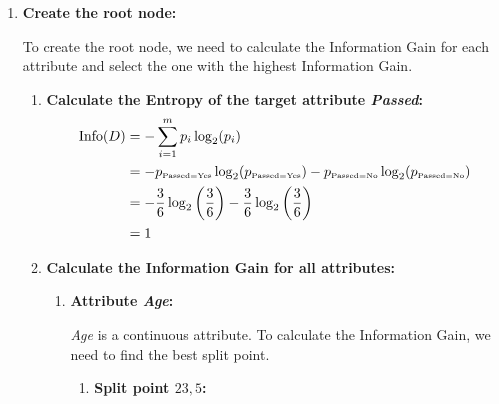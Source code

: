 \documentclass[
english,
smallborders
]{i6prcsht}
\newcommand{\OfSpecificValue}[3]{_{\text{\tiny #1#2#3}}}
\begin{document}
\begin{solution}
	\begin{enumerate}
		\item \textbf{Create the root node:}
		      
		      To create the root node, we need to calculate the Information Gain for each attribute and select the one with the highest Information Gain.
		      
		      \begin{enumerate}
			      \item \textbf{Calculate the Entropy of the target attribute \textit{Passed}:}
			            \begin{alignat*}{2}
				            \text{Info}(D) & = -\sum_{i=1}^{m}p_i \log_2(p_i)                                                                                                                          \\
				                           & = -p\OfSpecificValue{Passed}{=}{Yes} \log_2(p\OfSpecificValue{Passed}{=}{Yes})- p\OfSpecificValue{Passed}{=}{No} \log_2(p\OfSpecificValue{Passed}{=}{No}) \\
				                           & = -\frac{3}{6} \log_2\left(\frac{3}{6}\right) - \frac{3}{6} \log_2\left(\frac{3}{6}\right)                                                                \\
				                           & = 1                                                                                                                                                       \\
			            \end{alignat*}
			            
			      \item \textbf{Calculate the Information Gain for all attributes:}
			            
			            \begin{enumerate}
				            \item \textbf{Attribute \textit{Age}:}
				                  
				                  \textit{Age} is a continuous attribute. To calculate the Information Gain, we need to find the best split point.
				                  
				                  \begin{enumerate}
					                  \item \textbf{Split point $23,5$:}
					                        

\end{enumerate}
\end{enumerate}
\end{enumerate}
\end{enumerate}
\end{solution}
\end{document}

